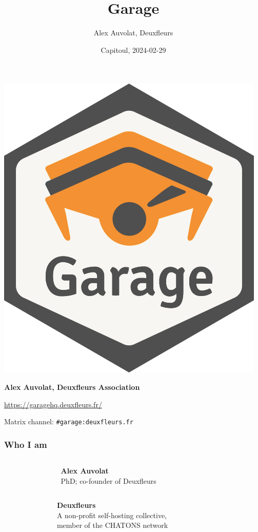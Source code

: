 \documentclass[aspectratio=169,xcolor={svgnames}]{beamer}
\title{Garage}
\author{Alex Auvolat, Deuxfleurs}
\date{Capitoul, 2024-02-29}
\begin{document}
\begin{frame}
	\centering
	\includegraphics[width=.3\linewidth]{../../sticker/Garage.png}
	\vspace{1em}

	{\large\bf Alex Auvolat, Deuxfleurs Association}
	\vspace{1em}

	\url{https://garagehq.deuxfleurs.fr/}

	Matrix channel: \texttt{\#garage:deuxfleurs.fr}
\end{frame}

\begin{frame}
	\frametitle{Who I am}
	\begin{columns}[t]
		\begin{column}{.2\textwidth}
			\centering
		\end{column}
		\begin{column}{.6\textwidth}
			\textbf{Alex Auvolat}\\
			PhD; co-founder of Deuxfleurs
		\end{column}
		\begin{column}{.2\textwidth}
			~
		\end{column}
	\end{columns}
	\vspace{2em}

	\begin{columns}[t]
		\begin{column}{.2\textwidth}
			\centering
		\end{column}
		\begin{column}{.6\textwidth}
			\textbf{Deuxfleurs}\\
			A non-profit self-hosting collective,\\
			member of the CHATONS network
		\end{column}
		\begin{column}{.2\textwidth}
			\centering
		\end{column}
	\end{columns}

\end{frame}
\end{document}
